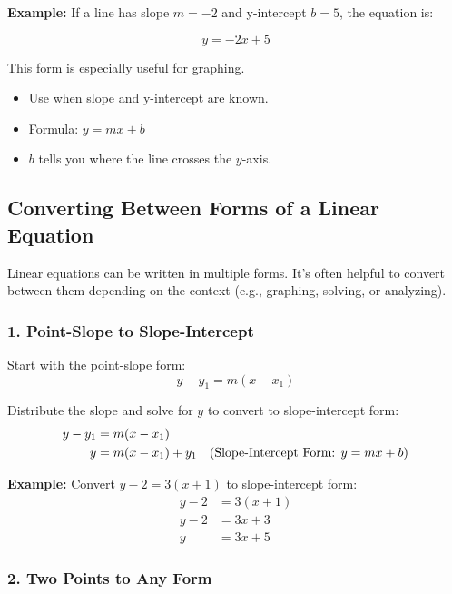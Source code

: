 \documentclass[11pt]{article}
\begin{document}
\textbf{Example:}
If a line has slope \( m = -2 \) and y-intercept \( b = 5 \), the equation is:

\[
y = -2x + 5
\]

This form is especially useful for graphing.

\begin{tcolorbox}[colback=orange!5!white, colframe=orange!80!black, title=Slope-Intercept Summary]
\begin{itemize}
  \item Use when slope and y-intercept are known.
  \item Formula: \( y = mx + b \)
  \item \( b \) tells you where the line crosses the \( y \)-axis.
\end{itemize}
\end{tcolorbox}
\subsection{Converting Between Forms of a Linear Equation}

Linear equations can be written in multiple forms. It’s often helpful to convert between them depending on the context (e.g., graphing, solving, or analyzing).

\subsubsection*{1. Point-Slope to Slope-Intercept}

Start with the point-slope form:
\[
y - y_1 = m(x - x_1)
\]

Distribute the slope and solve for \( y \) to convert to slope-intercept form:
\begin{align*}
y - y_1 &= m(x - x_1) \\
y &= m(x - x_1) + y_1 \quad \text{(Slope-Intercept Form: \( y = mx + b \))}
\end{align*}

\textbf{Example:}
Convert \( y - 2 = 3(x + 1) \) to slope-intercept form:
\begin{align*}
y - 2 &= 3(x + 1) \\
y - 2 &= 3x + 3 \\
y &= 3x + 5
\end{align*}

\subsubsection*{2. Two Points to Any Form}
\end{document}

